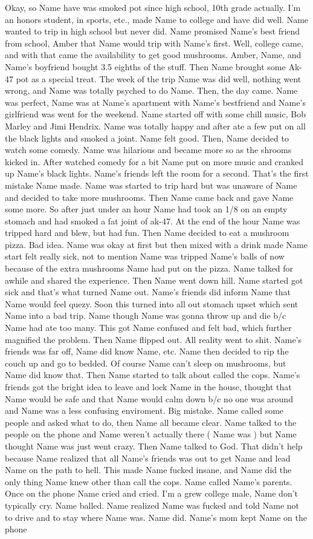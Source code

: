\documentclass[12pt]{book}
\begin{document}
Okay, so Name have was smoked pot since high school, 10th grade actually. I'm an honors student, in sports, etc., made Name to college and have did well. Name wanted to trip in high school but never did. Name promised Name's best friend from school, Amber that Name would trip with Name's first. Well, college came, and with that came the availability to get good mushrooms. Amber, Name, and Name's boyfriend bought 3.5 eighths of the stuff. Then Name brought some Ak-47 pot as a special treat. The week of the trip Name was did well, nothing went wrong, and Name was totally psyched to do Name. Then, the day came. Name was perfect, Name was at Name's apartment with Name's bestfriend and Name's girlfriend was went for the weekend. Name started off with some chill music, Bob Marley and Jimi Hendrix. Name was totally happy and after ate a few put on all the black lights and smoked a joint. Name felt good. Then, Name decided to watch some comedy. Name was hilarious and became more so as the shrooms kicked in. After watched comedy for a bit Name put on more music and cranked up Name's black lights. Name's friends left the room for a second. That's the first mistake Name made. Name was started to trip hard but was unaware of Name and decided to take more mushrooms. Then Name came back and gave Name some more. So after just under an hour Name had took an 1/8 on an empty stomach and had smoked a fat joint of ak-47. At the end of the hour Name was tripped hard and blew, but had fun. Then Name decided to eat a mushroom pizza. Bad idea. Name was okay at first but then mixed with a drink made Name start felt really sick, not to mention Name was tripped Name's balls of now because of the extra mushrooms Name had put on the pizza. Name talked for awhile and shared the experience. Then Name went down hill. Name started got sick and that's what turned Name out. Name's friends did inform Name that Name would feel quezy. Soon this turned into all out stomach upset which sent Name into a bad trip. Name though Name was gonna throw up and die b/c Name had ate too many. This got Name confused and felt bad, which further magnified the problem. Then Name flipped out. All reality went to shit. Name's friends was far off, Name did know Name, etc. Name then decided to rip the couch up and go to bedded. Of course Name can't sleep on mushrooms, but Name did know that. Then Name started to talk about called the cops. Name's friends got the bright idea to leave and lock Name in the house, thought that Name would be safe and that Name would calm down b/c no one was around and Name was a less confusing enviroment. Big mistake. Name called some people and asked what to do, then Name all became clear. Name talked to the people on the phone and Name weren't actually there ( Name was ) but Name thought Name was just went crazy. Then Name talked to God. That didn't help because Name realized that all Name's friends was out to get Name and lead Name on the path to hell. This made Name fucked insane, and Name did the only thing Name knew other than call the cops. Name called Name's parents. Once on the phone Name cried and cried. I'm a grew college male, Name don't typically cry. Name balled. Name realized Name was fucked and told Name not to drive and to stay where Name was. Name did. Name's mom kept Name on the phone 
\end{document}
